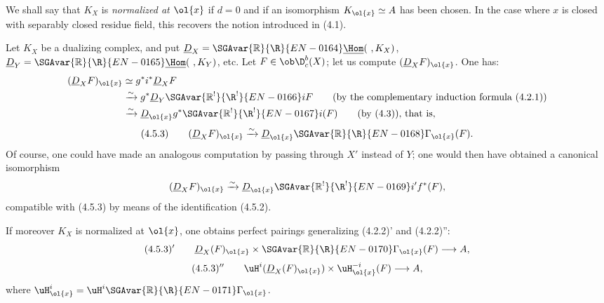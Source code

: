 We shall say that $K_X$ is \emph{normalized at $\ol{x}$} if $d=0$ and if an isomorphism $K_{\ol{x}}\simeq A$ has been chosen. In the case where $x$ is closed with separably closed residue field, this recovers the notion introduced in (4.1).

Let $K_X$ be a dualizing complex, and put $\underline{D}_X=\SGAvar{\mathbb{R}}{\R}{EN-0164}\underline{\Hom}(\ ,K_X)$, $\underline{D}_Y=\SGAvar{\mathbb{R}}{\R}{EN-0165}\underline{\Hom}(\ ,K_Y)$, etc. Let $F\in\ob\D_c^b(X)$; let us compute $(\underline{D}_XF)_{\ol{x}}$. One has:
\[
\begin{aligned}
(\underline{D}_XF)_{\ol{x}}&\simeq g^*i^*\underline{D}_X F\\
&\xrightarrow{\sim}g^*\underline{D}_Y\SGAvar{\mathbb{R}^{!}}{\R^{!}}{EN-0166}iF\qquad\text{(by the complementary induction formula (4.2.1))}\\
&\xrightarrow{\sim}\underline{D}_{\ol{x}}g^*\SGAvar{\mathbb{R}^{!}}{\R^{!}}{EN-0167}i(F)\qquad\text{(by (4.3)), that is,}
\end{aligned}
\]
\[
(4.5.3)\qquad (\underline{D}_X F)_{\ol{x}}\xrightarrow{\sim}\underline{D}_{\ol{x}}\SGAvar{\mathbb{R}}{\R}{EN-0168}\Gamma_{\ol{x}}(F).
\]
Of course, one could have made an analogous computation by passing through $X'$ instead of $Y$; one would then have obtained a canonical isomorphism
\[
(\underline{D}_XF)_{\ol{x}}\xrightarrow{\sim}\underline{D}_{\ol{x}}\SGAvar{\mathbb{R}^{!}}{\R^{!}}{EN-0169}i'f^*(F),
\]
compatible with (4.5.3) by means of the identification (4.5.2).

If moreover $K_X$ is normalized at $\ol{x}$, one obtains perfect pairings generalizing (4.2.2)' and (4.2.2)'':
\[
(4.5.3)'\qquad \underline{D}_X(F)_{\ol{x}}\times \SGAvar{\mathbb{R}}{\R}{EN-0170}\Gamma_{\ol{x}}(F)\longrightarrow A,
\]
\[
(4.5.3)''\qquad \uH^i(\underline{D}_X(F)_{\ol{x}})\times \uH_{\ol{x}}^{-i}(F)\longrightarrow A,
\]
where $\uH_{\ol{x}}^i=\uH^i\SGAvar{\mathbb{R}}{\R}{EN-0171}\Gamma_{\ol{x}}$.


